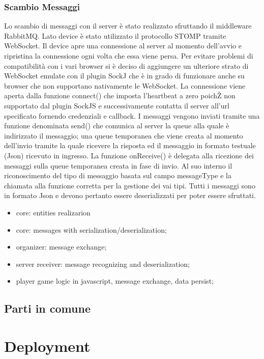 \documentclass[12pt, italian]{article}
\begin{document}
\subsubsection*{Scambio Messaggi}
Lo scambio di messaggi con il server è stato realizzato sfruttando il middleware RabbitMQ.
Lato device è stato utilizzato il protocollo STOMP tramite WebSocket.
Il device apre una connessione al server al momento dell'avvio e ripristina la connessione ogni volta che essa viene persa.
Per evitare problemi di compatibilità con i vari browser si è deciso di aggiungere un ulteriore strato di WebSocket emulate con il plugin SockJ che è in grado di funzionare anche su browser che non supportano nativamente le WebSocket.
La connessione viene aperta dalla funzione connect() che imposta l'heartbeat a zero poichŽ non supportato dal plugin SockJS e successivamente contatta il server all'url specificato fornendo credenziali e callback.
I messaggi vengono inviati tramite una funzione denominata send() che comunica al server la queue alla quale è indirizzato il messaggio; una queue temporanea che viene creata al momento dell'invio tramite la quale ricevere la risposta ed il messaggio in formato testuale (Json) ricevuto in ingresso.
La funzione onReceive() è delegata alla ricezione dei messaggi sulla queue temporanea creata in fase di invio. Al suo interno il riconoscimento del tipo di messaggio basata sul campo messageType e la chiamata alla funzione corretta per la gestione dei vai tipi.
Tutti i messaggi sono in formato Json e devono pertanto essere deserializzati per poter essere sfruttati.
\begin{itemize}
	\item core: entities realizarion
	\item core: messages with serialization/deserialization;
	\item organizer: message exchange;
	\item server receiver: message recognizing and deserialization;
	\item player game logic in javascript, message exchange, data persist;
\end{itemize}
\subsection{Parti in comune}
\section{Deployment}
\end{document}
